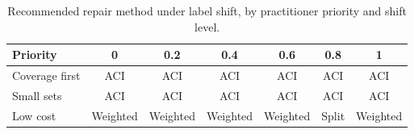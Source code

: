 \begin{table}[t]\centering
\caption{Recommended repair method under label shift, by practitioner priority and shift level.}
\label{tab:guide_label}
\begin{tabular}{lcccccc}
\toprule
Priority & 0 & 0.2 & 0.4 & 0.6 & 0.8 & 1 \\
\midrule
Coverage first & ACI & ACI & ACI & ACI & ACI & ACI \\
Small sets & ACI & ACI & ACI & ACI & ACI & ACI \\
Low cost & Weighted & Weighted & Weighted & Weighted & Split & Weighted \\
\bottomrule
\end{tabular}
\end{table}